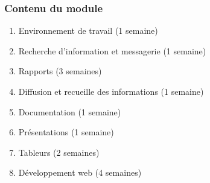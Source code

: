 \documentclass{beamer}
\begin{document}
\begin{frame}
\frametitle{Contenu du module}

\begin{enumerate}
	\item Environnement de travail (1 semaine)
	\item Recherche d'information et messagerie (1 semaine)
	\item Rapports (3 semaines)
	\item Diffusion et recueille des informations (1 semaine)
	\item Documentation (1 semaine)
	\item Présentations (1 semaine)
	\item Tableurs (2 semaines) 
	\item Développement web (4 semaines)
\end{enumerate}

\end{frame}

%
% 
\end{document}
